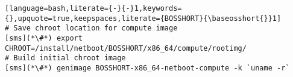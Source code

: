 \begin{lstlisting}[language=bash,literate={-}{-}1,keywords={},upquote=true,keepspaces,literate={BOSSHORT}{\baseosshort{}}1]
# Save chroot location for compute image
[sms](*\#*) export CHROOT=/install/netboot/BOSSHORT/x86_64/compute/rootimg/
# Build initial chroot image
[sms](*\#*) genimage BOSSHORT-x86_64-netboot-compute -k `uname -r`
\end{lstlisting}
